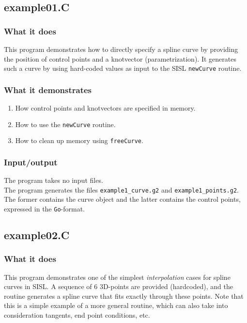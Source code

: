 \subsection{example01.C}

\subsubsection{What it does}
This program demonstrates how to directly specify a spline curve by providing the 
position of control points and a knotvector (parametrization).  It generates such
a curve by using hard-coded values as input to the SISL  \verb/newCurve/ routine.
\subsubsection{What it demonstrates}
\begin{enumerate}
\item How control points and knotvectors are specified in memory.
\item How to use the \verb/newCurve/ routine.
\item How to clean up memory using \verb/freeCurve/.
\end{enumerate}

\subsubsection{Input/output}
The program takes no input files.\\
The program generates the files \verb/example1_curve.g2/ and \verb/example1_points.g2/.
The former contains the curve object and the latter contains the control points, expressed
in the \verb/Go/-format.

\subsection{example02.C}

\subsubsection{What it does}
This program demonstrates one of the simplest \emph{interpolation} cases for spline 
curves in SISL.  A sequence of 6 3D-points are provided (hardcoded), and the routine
generates a spline curve that fits exactly through these points.  Note that this is a
simple example of a more general routine, which can also take into consideration
tangents, end point conditions, etc.


